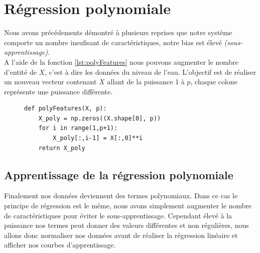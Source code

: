 \section{Régression polynomiale}

Nous avons précédements démontré à plusieurs reprises que notre système comporte un nombre insufisant de caractéristiques, notre bias est élevé \textit{(sous-apprentissage)}. \\
A l'aide de la fonction \ref{lst:polyFeatures} nous pouvons augmenter le nombre d'entité de $X$, c'est à dire les données du niveau de l'eau. L'objectif est de réaliser un nouveau vecteur contenant $X$ allant de la puissance 1 à $p$, chaque colone représente une 
puissance différente. 

\begin{figure}[!h]
\begin{verbatim}
def polyFeatures(X, p):
    X_poly = np.zeros((X.shape[0], p))
    for i in range(1,p+1):
        X_poly[:,i-1] = X[:,0]**i
    return X_poly
\end{verbatim}   
\end{figure}

\subsection{Apprentissage de la régression polynomiale}

Finalement nos données deviennent des termes polynomiaux. Dans ce cas le principe de régression est le même, nous avons simplement augmenter le nombre de caractéristiques pour 
éviter le sous-apprentissage. 
Cependant élevé à la puissance nos termes peut donner des valeurs différentes et non régulières, nous allons donc normaliser nos données avant de réaliser la régression linéaire et afficher nos courbes d'apprentissage.

